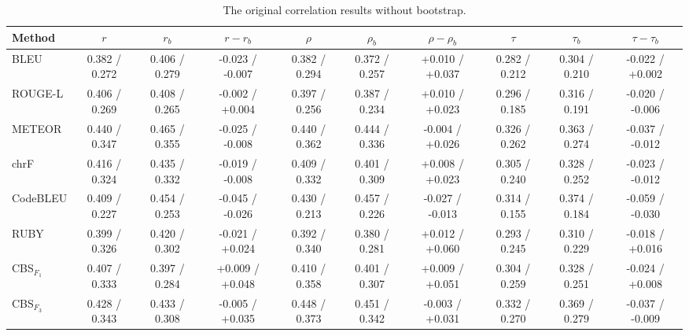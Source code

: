 \begin{table}[t]
    \centering
    \scriptsize
    \setlength{\tabcolsep}{3.5pt}
    \caption{The original correlation results without bootstrap.}
    \label{tab:unified-settings}
    \begin{tabular}{@{}
        l|ccc|ccc|ccc@{}}
        \toprule
        Method & $r$ & $r_b$ & $r-r_b$ & $\rho$ & $\rho_b$ & $\rho-\rho_b$ & $\tau$ & $\tau_b$ & $\tau-\tau_b$ \\
        \midrule
        \midrule
        BLEU                    & 0.382 / 0.272   & 0.406 / 0.279   & -0.023 / -0.007                     & 0.382 / 0.294   & 0.372 / 0.257   & +0.010 / +0.037                     & 0.282 / 0.212   & 0.304 / 0.210   & -0.022 / +0.002                     \\
        ROUGE-L                 & 0.406 / 0.269   & 0.408 / 0.265   & -0.002 / +0.004                     & 0.397 / 0.256   & 0.387 / 0.234   & +0.010 / +0.023                     & 0.296 / 0.185   & 0.316 / 0.191   & -0.020 / -0.006                     \\
        METEOR                  & 0.440 / 0.347   & 0.465 / 0.355   & -0.025 / -0.008                     & 0.440 / 0.362   & 0.444 / 0.336   & -0.004 / +0.026                     & 0.326 / 0.262   & 0.363 / 0.274   & -0.037 / -0.012                     \\
        chrF                    & 0.416 / 0.324   & 0.435 / 0.332   & -0.019 / -0.008                     & 0.409 / 0.332   & 0.401 / 0.309   & +0.008 / +0.023                     & 0.305 / 0.240   & 0.328 / 0.252   & -0.023 / -0.012                     \\
        CodeBLEU                & 0.409 / 0.227   & 0.454 / 0.253   & -0.045 / -0.026                     & 0.430 / 0.213   & 0.457 / 0.226   & -0.027 / -0.013                     & 0.314 / 0.155   & 0.374 / 0.184   & -0.059 / -0.030                     \\
        RUBY                    & 0.399 / 0.326   & 0.420 / 0.302   & -0.021 / +0.024                     & 0.392 / 0.340   & 0.380 / 0.281   & +0.012 / +0.060                     & 0.293 / 0.245   & 0.310 / 0.229   & -0.018 / +0.016                     \\
        CBS$_{F_1}$             & 0.407 / 0.333   & 0.397 / 0.284   & +0.009 / +0.048                     & 0.410 / 0.358   & 0.401 / 0.307   & +0.009 / +0.051                     & 0.304 / 0.259   & 0.328 / 0.251   & -0.024 / +0.008                     \\
        CBS$_{F_3}$             & 0.428 / 0.343   & 0.433 / 0.308   & -0.005 / +0.035                     & 0.448 / 0.373   & 0.451 / 0.342   & -0.003 / +0.031                     & 0.332 / 0.270   & 0.369 / 0.279   & -0.037 / -0.009                     \\

\end{tabular}
\end{table}

